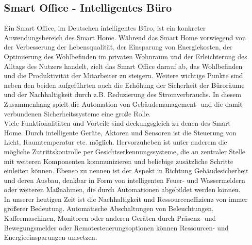     \subsection{Smart Office - Intelligentes Büro}
    \label{subsec:smartoffice}
        Ein Smart Office, im Deutschen intelligentes Büro, ist ein konkreter Anwendungsbereich des Smart Home. 
        Während das Smart Home vorwiegend von der Verbesserung der Lebensqualität, der Einsparung von Energiekosten,  
        der Optimierung des Wohlbefinden im privaten Wohnraum und der Erleichterung des Alltags des Nutzers handelt, 
        zielt das Smart Office darauf ab, das Wohlbefinden und die Produktivität der Mitarbeiter zu steigern. Weitere 
        wichtige Punkte sind neben den beiden aufgeführten auch die Erhöhung der Sicherheit der Büroräume und der 
        Nachhaltigkeit durch z.B. Reduzierung des Stromverbrauchs. In diesem Zusammenhang spielt die Automation 
        von Gebäudemanagement- und die damit verbundenen Sicherheitssysteme eine große Rolle. 
        \\
        \linebreak
        Viele Funktionalitäten und Vorteile sind deckungsgleich zu denen des Smart Home. Durch intelligente Geräte, Aktoren und 
        Sensoren ist die Steuerung von Licht, Raumtemperatur etc. möglich. Hervorzuheben ist unter anderem die mögliche Zutrittskontrolle 
        per Gesichtserkennungssysteme, die an zentraler Stelle mit weiteren Komponenten kommunizieren und beliebige zusätzliche Schritte 
        einleiten können. Ebenso zu nennen ist der Aspekt in Richtung Gebäudesicherheit und deren Ausbau, denkbar in Form von intelligenten 
        Feuer- und Wassermeldern oder weiteren Maßnahmen, die durch Automationen abgebildet werden können. 
        \\
        In unserer heutigen Zeit ist die Nachhaltigkeit und Ressourceneffizienz von immer größerer Bedeutung.
        Automatische Abschaltungen von Beleuchtungen, Kaffeemaschinen, Monitoren oder anderen Geräten durch 
        Präsenz- und Bewegungsmelder oder Remotesteuerungsoptionen können Ressourcen- und Energieeinsparungen umsetzen. 
        
